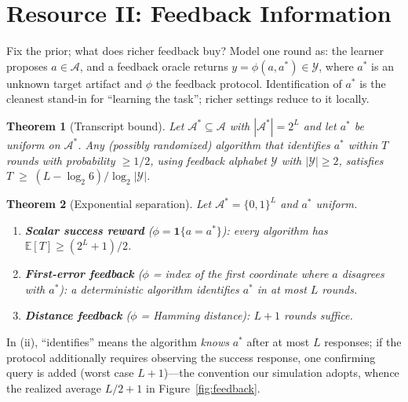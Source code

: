 \documentclass{article}
\theoremstyle{plain}
\newtheorem{theorem}{Theorem}[section]
\theoremstyle{definition}
\theoremstyle{remark}
\newcommand{\A}{\mathcal{A}}
\newcommand{\Y}{\mathcal{Y}}
\newcommand{\E}{\mathbb{E}}
\begin{document}
\section{Resource II: Feedback Information}
\label{sec:feedback}

Fix the prior; what does richer feedback buy? Model one round as: the learner proposes $a \in \A$, and a feedback oracle returns $y = \phi(a, a^*) \in \Y$, where $a^*$ is an unknown target artifact and $\phi$ the feedback protocol. Identification of $a^*$ is the cleanest stand-in for ``learning the task''; richer settings reduce to it locally.

\begin{theorem}[Transcript bound]
\label{thm:fano}
Let $\A^* \subseteq \A$ with $|\A^*| = 2^L$ and let $a^*$ be uniform on $\A^*$. Any (possibly randomized) algorithm that identifies $a^*$ within $T$ rounds with probability $\ge 1/2$, using feedback alphabet $\Y$ with $|\Y| \ge 2$, satisfies
$T \;\ge\; (L - \log_2 6) / \log_2 |\Y|$.
\end{theorem}

\begin{theorem}[Exponential separation]
\label{thm:separation}
Let $\A^* = \{0,1\}^L$ and $a^*$ uniform.
\begin{enumerate}\itemsep1pt
\item[(i)] \textbf{Scalar success reward} ($\phi = \mathbf{1}\{a = a^*\}$): every algorithm has $\E[T] \ge (2^L + 1)/2$.
\item[(ii)] \textbf{First-error feedback} ($\phi$ = index of the first coordinate where $a$ disagrees with $a^*$): a deterministic algorithm identifies $a^*$ in at most $L$ rounds.
\item[(iii)] \textbf{Distance feedback} ($\phi$ = Hamming distance): $L + 1$ rounds suffice.
\end{enumerate}
\end{theorem}

In (ii), ``identifies'' means the algorithm \emph{knows} $a^*$ after at most $L$ responses; if the protocol additionally requires observing the success response, one confirming query is added (worst case $L+1$)---the convention our simulation adopts, whence the realized average $L/2+1$ in Figure~\ref{fig:feedback}.
\end{document}
